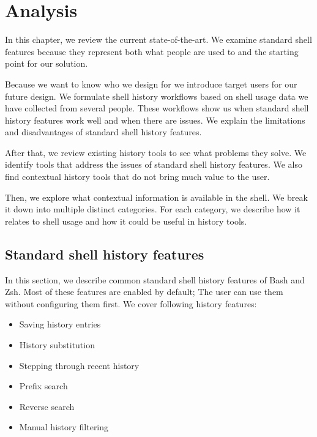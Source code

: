 
\chapter{Analysis}

In this chapter, we review the current state-of-the-art. 
We examine standard shell features because they represent both what people are used to and the starting point for our solution.

Because we want to know who we design for we introduce target users for our future design. We formulate shell history workflows based on shell usage data we have collected from several people. %
These workflows show us when standard shell history features work well and when there are issues. We explain the limitations and disadvantages of standard shell history features.

After that, we review existing history tools to see what problems they solve. We identify tools that address the issues of standard shell history features. We also find contextual history tools that do not bring much value to the user.

Then, we explore what contextual information is available in the shell. We break it down into multiple distinct categories. For each category, we describe how it relates to shell usage and how it could be useful in history tools.


\section{Standard shell history features}

In this section, we describe common standard shell history features of Bash\cite{bashman} and Zsh\cite{zshdocs}. Most of these features are enabled by default; The user can use them without configuring them first.
We cover following history features:


\begin{itemize}
    \item Saving history entries
    \item History substitution
    \item Stepping through recent history
    \item Prefix search
    \item Reverse search
    \item Manual history filtering
\end{itemize}


